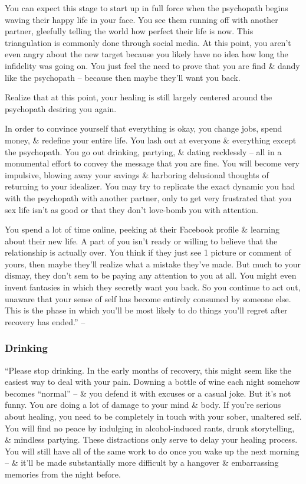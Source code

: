 \documentclass{article}
\numberwithin{equation}{section}
\begin{document}
You can expect this stage to start up in full force when the psychopath begins waving their happy life in your face. You see them running off with another partner, gleefully telling the world how perfect their life is now. This triangulation is commonly done through social media. At this point, you aren't even angry about the new target because you likely have no idea how long the infidelity was going on. You just feel the need to prove that you are find \& dandy like the psychopath -- because then maybe they'll want you back.

Realize that at this point, your healing is still largely centered around the psychopath desiring you again.

In order to convince yourself that everything is okay, you change jobs, spend money, \& redefine your entire life. You lash out at everyone \& everything except the psychopath. You go out drinking, partying, \& dating recklessly -- all in a monumental effort to convey the message that you are fine. You will become very impulsive, blowing away your savings \& harboring delusional thoughts of returning to your idealizer. You may try to replicate the exact dynamic you had with the psychopath with another partner, only to get very frustrated that you sex life isn't as good or that they don't love-bomb you with attention.

You spend a lot of time online, peeking at their Facebook profile \& learning about their new life. A part of you isn't ready or willing to believe that the relationship is actually over. You think if they just see 1 picture or comment of yours, then maybe they'll realize what a mistake they've made. But much to your dismay, they don't sem to be paying any attention to you at all. You might even invent fantasies in which they secretly want you back. So you continue to act out, unaware that your sense of self has become entirely consumed by someone else. This is the phase in which you'll be most likely to do things you'll regret after recovery has ended.'' -- \cite[pp. 95--96]{MacKenzie2015}

\subsubsection{Drinking}
``Please stop drinking. In the early months of recovery, this might seem like the easiest way to deal with your pain. Downing a bottle of wine each night somehow becomes ``normal'' -- \& you defend it with excuses or a casual joke. But it's not funny. You are doing a lot of damage to your mind \& body. If you're serious about healing, you need to be completely in touch with your sober, unaltered self. You will find no peace by indulging in alcohol-induced rants, drunk storytelling, \& mindless partying. These distractions only serve to delay your healing process. You will still have all of the same work to do once you wake up the next morning -- \& it'll be made substantially more difficult by a hangover \& embarrassing memories from the night before.
\end{document}
